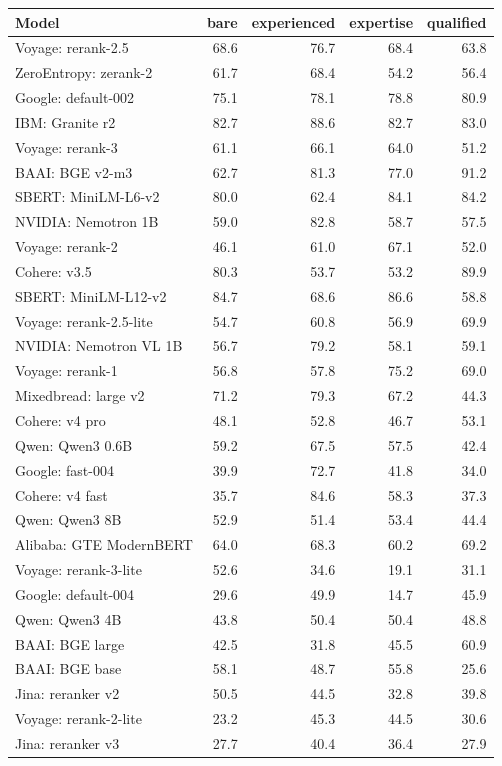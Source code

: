\begin{tabular}{lrrrr}
\toprule
Model & bare & experienced & expertise & qualified \\
\midrule
Voyage: rerank-2.5 & 68.6 & 76.7 & 68.4 & 63.8 \\
ZeroEntropy: zerank-2 & 61.7 & 68.4 & 54.2 & 56.4 \\
Google: default-002 & 75.1 & 78.1 & 78.8 & 80.9 \\
IBM: Granite r2 & 82.7 & 88.6 & 82.7 & 83.0 \\
Voyage: rerank-3 & 61.1 & 66.1 & 64.0 & 51.2 \\
BAAI: BGE v2-m3 & 62.7 & 81.3 & 77.0 & 91.2 \\
SBERT: MiniLM-L6-v2 & 80.0 & 62.4 & 84.1 & 84.2 \\
NVIDIA: Nemotron 1B & 59.0 & 82.8 & 58.7 & 57.5 \\
Voyage: rerank-2 & 46.1 & 61.0 & 67.1 & 52.0 \\
Cohere: v3.5 & 80.3 & 53.7 & 53.2 & 89.9 \\
SBERT: MiniLM-L12-v2 & 84.7 & 68.6 & 86.6 & 58.8 \\
Voyage: rerank-2.5-lite & 54.7 & 60.8 & 56.9 & 69.9 \\
NVIDIA: Nemotron VL 1B & 56.7 & 79.2 & 58.1 & 59.1 \\
Voyage: rerank-1 & 56.8 & 57.8 & 75.2 & 69.0 \\
Mixedbread: large v2 & 71.2 & 79.3 & 67.2 & 44.3 \\
Cohere: v4 pro & 48.1 & 52.8 & 46.7 & 53.1 \\
Qwen: Qwen3 0.6B & 59.2 & 67.5 & 57.5 & 42.4 \\
Google: fast-004 & 39.9 & 72.7 & 41.8 & 34.0 \\
Cohere: v4 fast & 35.7 & 84.6 & 58.3 & 37.3 \\
Qwen: Qwen3 8B & 52.9 & 51.4 & 53.4 & 44.4 \\
Alibaba: GTE ModernBERT & 64.0 & 68.3 & 60.2 & 69.2 \\
Voyage: rerank-3-lite & 52.6 & 34.6 & 19.1 & 31.1 \\
Google: default-004 & 29.6 & 49.9 & 14.7 & 45.9 \\
Qwen: Qwen3 4B & 43.8 & 50.4 & 50.4 & 48.8 \\
BAAI: BGE large & 42.5 & 31.8 & 45.5 & 60.9 \\
BAAI: BGE base & 58.1 & 48.7 & 55.8 & 25.6 \\
Jina: reranker v2 & 50.5 & 44.5 & 32.8 & 39.8 \\
Voyage: rerank-2-lite & 23.2 & 45.3 & 44.5 & 30.6 \\
Jina: reranker v3 & 27.7 & 40.4 & 36.4 & 27.9 \\
\bottomrule
\end{tabular}

